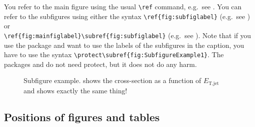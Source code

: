 You refer to the main figure using the usual \verb|\ref| command, e.g.\ see \Fig{\ref{fig:subfigexample}}.
You can refer to the subfigures using either the syntax \verb|\ref{fig:subfiglabel}| 
(e.g.\ see \Fig{\ref{fig:SubfigureExample2}}) or\\
\verb|\ref{fig:mainfiglabel}\subref{fig:subfiglabel}|
(e.g.\ see ).
Note that if you use the  package and want to use the labels of the subfigures in the caption,
you have to use the syntax \verb|\protect\subref{fig:SubfigureExample1}|.
The packages  and  do not need protect, but it does not do any harm.

\begin{figure}[htbp]
  \centering
  \caption{Subfigure example.
    \protect{} shows the cross-section as a function of $E_{\text{T,jet}}$ and 
    \protect{} shows exactly the same thing!}
  \label{fig:subfigexample}
\end{figure}


\subsection{Positions of figures and tables}

